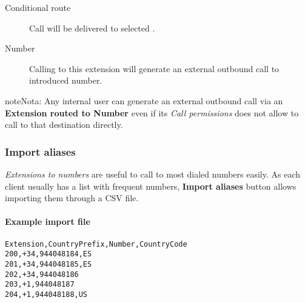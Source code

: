 \documentclass[letterpaper,10pt,spanish]{sphinxmanual}
\begin{document}
\begin{description}
\item[{Conditional route}] \leavevmode{}\label{administration_portal/client/vpbx/extensions:term-conditional-route}
Call will be delivered to selected {\hyperref[administration_portal/client/vpbx/routing_endpoints/conditional_routes:conditional\string-routes]{}}.

\item[{Number}] \leavevmode{}\label{administration_portal/client/vpbx/extensions:term-9}
Calling to this extension will generate an external outbound call
to introduced number.

\end{description}

\begin{notice}{note}{Nota:}
Any internal user can generate an external outbound call via an \textbf{Extension
routed to Number} even if its \emph{Call permissions} does not allow to
call to that destination directly.
\end{notice}


\subsubsection{Import aliases}
\label{administration_portal/client/vpbx/extensions:import-aliases}
\emph{Extensions to numbers} are useful to call to most dialed numbers easily. As each
client usually has a list with frequent numbers, \textbf{Import aliases} button allows
importing them through a CSV file.
\paragraph{Example import file}

\begin{Verbatim}[commandchars=\\\{\}]
Extension,CountryPrefix,Number,CountryCode
200,+34,944048184,ES
201,+34,944048185,ES
202,+34,944048186
203,+1,944048187
204,+1,944048188,US
\end{Verbatim}
\end{document}
